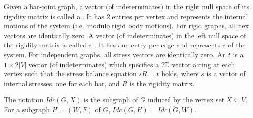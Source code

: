 Given a bar-joint graph, a vector (of indeterminates) in the right
null space of its rigidity matrix is called a . It
has 2 entries per vertex and represents the internal motions of the
system (i.e.\ modulo rigid body motions). For rigid graphs, all flex
vectors are identically zero.
%
A vector (of indeterminates) in the left null space of the rigidity
matrix is called a . It has one entry per edge and
represents a  of the system. For independent graphs,
all stress vectors are identically zero.
%
An  $t$ is a $1\times 2|V|$ vector  (of
indeterminates) which specifies a 2D vector acting at each vertex such
that the stress balance equation $sR = t$ holds, where $s$ is a vector
of internal stresses, one for each bar, and $R$ is the rigidity
matrix.

The notation $Idc(G,X)$ is the subgraph of $G$ induced by the vertex set
$X\subseteq V$. For a subgraph $H=(W,F)$ of $G$, $Idc(G,H)=Idc(G,W)$.












